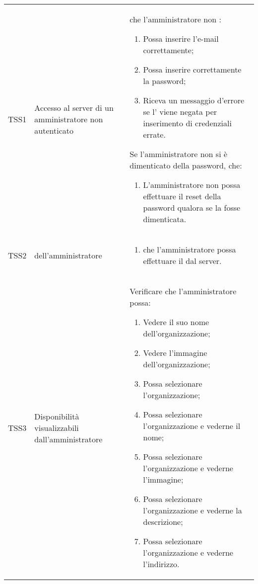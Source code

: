 {\begin{longtable}{ c  C{3cm}  C{11cm} }
TSS1 & Accesso al server di un amministratore non autenticato & 
 che l'amministratore non :
\begin{enumerate}
    \item Possa inserire l'e-mail correttamente;
    \item Possa inserire correttamente la password;
    \item Riceva un messaggio d'errore se l' viene negata per inserimento di credenziali errate.
\end{enumerate}
Se l'amministratore non  si è dimenticato della password,  che:
\begin{enumerate}
    \item L'amministratore non  possa effettuare il reset della password qualora se la fosse dimenticata.
\end{enumerate} \\

TSS2 &  dell'amministratore  & \begin{enumerate}
    \item {} che l'amministratore  possa effettuare il  dal server.
\end{enumerate} \\

TSS3 & Disponibilità  visualizzabili dall'amministratore &
Verificare che l'amministratore possa:
\begin{enumerate}
    \item Vedere il suo nome dell'organizzazione;
    \item Vedere l'immagine dell'organizzazione;
    \item Possa selezionare l'organizzazione;
    \item Possa selezionare l'organizzazione e vederne il nome;
    \item Possa selezionare l'organizzazione e vederne l'immagine;
    \item Possa selezionare l'organizzazione e vederne la descrizione;
    \item Possa selezionare l'organizzazione e vederne l'indirizzo.
\end{enumerate} \\


\end{longtable}}
